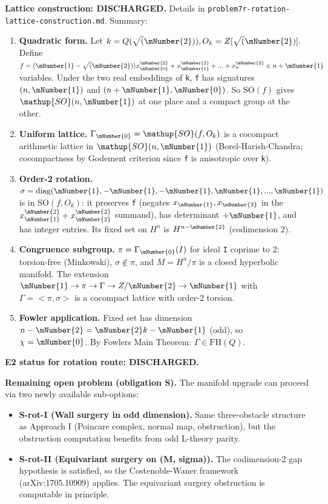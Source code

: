 \textbf{Lattice construction: DISCHARGED.} Details in
\texttt{problem7r-rotation-lattice-construction.md}. Summary:

\begin{enumerate}
\def\labelenumi{\arabic{enumi}.}
\item
  \textbf{Quadratic form.} Let \(k = Q(\sqrt(\mNumber{2})), O_{k} = Z[\sqrt(\mNumber{2})].\) Define
  \(f = (\mNumber{1} - \sqrt(\mNumber{2}))x_\mNumber{0}^\mNumber{2} + x_\mNumber{1}^\mNumber{2} + ... + x_{n}^\mNumber{2} \in n+\mNumber{1}\) variables.
  Under the two real embeddings of \texttt{k}, \texttt{f} has signatures \((n, \mNumber{1})\) and
  \((n+\mNumber{1}, \mNumber{0})\). So \(\mathup{SO}(f)\) gives \(\mathup{SO}(n, \mNumber{1})\) at one place and a compact
  group at the other.
\item
  \textbf{Uniform lattice.} \(\Gamma_\mNumber{0} = \mathup{SO}(f, O_{k})\) is a cocompact arithmetic
  lattice in \(\mathup{SO}(n, \mNumber{1})\) (Borel-Harish-Chandra; cocompactness by Godement
  criterion since \texttt{f} is anisotropic over \texttt{k}).
\item
  \textbf{Order-2 rotation.} \(\sigma = \operatorname{diag}(\mNumber{1}, -\mNumber{1}, -\mNumber{1}, \mNumber{1}, ..., \mNumber{1})\) is in
  \(\mathup{SO}(f, O_{k})\): it preserves \texttt{f} (negates \(x_\mNumber{1}, x_\mNumber{2}\) in the \(x_\mNumber{1}^\mNumber{2}+x_\mNumber{2}^\mNumber{2}\)
  summand), has determinant \(+\mNumber{1}\), and has integer entries. Its fixed set on
  \(H^{n}\) is \(H^{n-\mNumber{2}}\) (codimension 2).
\item
  \textbf{Congruence subgroup.} \(\pi = \Gamma_\mNumber{0}(I)\) for ideal \texttt{I} coprime to 2:
  torsion-free (Minkowski), \(\sigma \notin \pi\), and \(M = H^{n}/\pi\) is a closed
  hyperbolic manifold. The extension \(\mNumber{1} \to \pi \to \Gamma \to Z/\mNumber{2} \to \mNumber{1}\) with
  \(\Gamma = <\pi, \sigma>\) is a cocompact lattice with order-2 torsion.
\item
  \textbf{Fowler application.} Fixed set has dimension \(n-\mNumber{2} = \mNumber{2}k-\mNumber{1}\) (odd), so
  \(\chi = \mNumber{0}\). By Fowler\textquotesingle s Main Theorem: \(\Gamma \in \mathup{FH}(Q)\).
\end{enumerate}

\textbf{E2 status for rotation route: DISCHARGED.}

\textbf{Remaining open problem (obligation S).} The manifold upgrade can proceed
via two newly available sub-options:

\begin{itemize}
\tightlist
\item
  \textbf{S-rot-I (Wall surgery in odd dimension).} Same three-obstacle structure
  as Approach I (Poincare complex, normal map, obstruction), but the
  obstruction computation benefits from odd L-theory parity.
\item
  \textbf{S-rot-II (Equivariant surgery on (M, sigma)).} The codimension-2 gap
  hypothesis is satisfied, so the Costenoble-Waner framework (arXiv:1705.10909)
  applies. The equivariant surgery obstruction is computable in principle.
\end{itemize}

